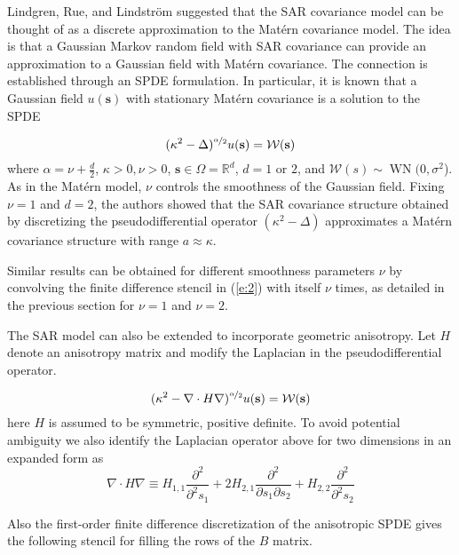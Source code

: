 \documentclass[review]{elsarticle}
\begin{document}
Lindgren, Rue, and Lindstr{\"o}m \cite{lindgren2011explicit} suggested that the SAR covariance model can be thought of as a discrete approximation to the Mat\'ern covariance model. The idea is that a Gaussian Markov random field with SAR covariance can provide an approximation to a Gaussian field with Mat\'ern covariance. The connection is established through an SPDE formulation. In particular, it is known that a Gaussian field $u(\mathbf s)$ with stationary Mat\'ern covariance is a solution to the SPDE

$$ (\kappa^2 - \Delta)^{\nicefrac{\alpha}{2}} u(\mathbf s) = \mathcal{W}(\mathbf s) $$
where $\alpha = \nu + \frac{d}{2}$, $\kappa > 0, \nu > 0$, $\mathbf s \in \Omega = \mathbb{R}^d$, $d = 1$ or $2$, and $\mathcal{W}(s) \sim \operatorname{WN}(0, \sigma^2$). As in the Mat\'ern model, $\nu$ controls the smoothness of the Gaussian field. Fixing $\nu = 1$ and $d = 2$, the authors showed that the SAR covariance structure obtained by discretizing the pseudodifferential operator $(\kappa^2 - \Delta)$ approximates a Mat\'ern covariance structure with range $a \approx \kappa$. 

Similar results can be obtained for different smoothness parameters $\nu$ by convolving the finite difference stencil in (\ref{e:2}) with itself $\nu$ times, as detailed in the previous section for $\nu=1$ and $\nu=2$.

 The SAR model can also be extended to incorporate geometric anisotropy. Let $H$  denote an anisotropy matrix and modify the  Laplacian in the pseudodifferential operator.

\begin{equation}
\label{SPDE}
 (\kappa^2 - \nabla \cdot H \nabla)^{\nicefrac{\alpha}{2}} u(\mathbf s) = \mathcal{W}(\mathbf s) 
 \end{equation} 
here $H$ is assumed to be symmetric, positive definite. 
 To avoid potential ambiguity we also identify  the Laplacian  operator above for two dimensions  in an expanded form as 
\[  \nabla \cdot H \nabla  \equiv  H_{1,1} \frac{\partial^2}{\partial^2 s_1} +  2 H_{2,1} \frac{\partial^2}{\partial s_1 \partial s_2} + H_{2,2} \frac{\partial^2}{\partial^2 s_2} \]

Also the first-order finite difference discretization of the anisotropic SPDE gives the following stencil for filling the rows of the $B$ matrix.
\end{document}
